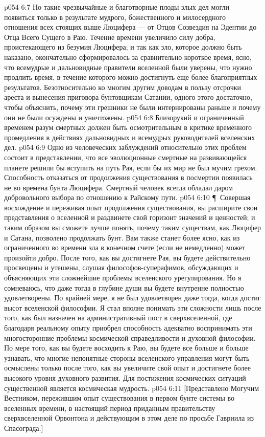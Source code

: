 \vs p054 6:7 Но такие чрезвычайные и благотворные плоды злых дел могли появиться только в результате мудрого, божественного и милосердного отношения всех стоящих выше Люцифера --- от Отцов Созвездия на Эдентии до Отца Всего Сущего в Раю. Течение времени увеличило силу добра, проистекающего из безумия Люцифера; и так как зло, которое должно быть наказано, окончательно сформировалось за сравнительно короткое время, ясно, что всемудрые и дальновидные правители вселенной были уверены, что нужно продлить время, в течение которого можно достигнуть еще более благоприятных результатов. Безотносительно ко многим другим доводам в пользу отсрочки ареста и вынесения приговора бунтовщикам Сатании, одного этого достаточно, чтобы объяснить, почему эти грешники не были интернированы раньше и почему они не были осуждены и уничтожены.
\vs p054 6:8 Близорукий и ограниченный временем разум смертных должен быть осмотрительным в критике временного промедления в действиях дальновидных и всемудрых руководителей вселенских дел.
\vs p054 6:9 Одно из человеческих заблуждений относительно этих проблем состоит в представлении, что все эволюционные смертные на развивающейся планете решили бы вступить на путь Рая, если бы их мир не был мучим грехом. Способность отказаться от продолжения существования в посмертии появилась не во времена бунта Люцифера. Смертный человек всегда обладал даром добровольного выбора по отношению к Райскому пути.
\vs p054 6:10 \P\ Совершая восхождение и переживая опыт продолжения существования, вы расширите свои представления о вселенной и раздвинете свой горизонт значений и ценностей; и таким образом вы сможете лучше понять, почему таким существам, как Люцифер и Сатана, позволено продолжать бунт. Вам также станет более ясно, как из ограниченного во времени зла в конечном счете (если не немедленно) может произойти добро. После того, как вы достигнете Рая, вы будете действительно просвещены и утешены, слушая философов\hyp{}суперафимов, обсуждающих и объясняющих эти сложнейшие проблемы вселенского урегулирования. Но я сомневаюсь, что даже тогда в глубине души вы будете внутренне полностью удовлетворены. По крайней мере, я не был удовлетворен даже тогда, когда достиг высот вселенской философии. Я стал вполне понимать эти сложности лишь после того, как был назначен на административный пост в сверхвселенной, где благодаря реальному опыту приобрел способность адекватно воспринимать эти многосторонние проблемы космической справедливости и духовной философии. По мере того, как вы будете восходить к Раю, вы будете все больше и больше узнавать, что многие непонятные стороны вселенского управления могут быть осмыслены только после того, как вы увеличите свой опыт и достигнете более высокого уровня духовного развития. Для постижения космических ситуаций существенной является космическая мудрость.
\vs p054 6:11 [Представлено Могучим Вестником, пережившим опыт существования в первом бунте системы во вселенных времени, в настоящий период приданным правительству сверхвселенной Орвонтона и действующим в этом деле по просьбе Гавриила из Спасограда.]
